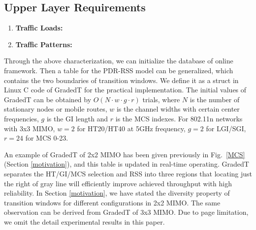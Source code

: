 \documentclass[draftclsnofoot,journal,onecolumn,11pt]{IEEEtran}
\begin{document}
\subsection{Upper Layer Requirements} \label{sect:upper}

\begin{enumerate}
  \item \textbf{Traffic Loads:}
  \item \textbf{Traffic Patterns:}
\end{enumerate}

Through the above characterization, we can initialize the database of online framework. Then a table for the PDR-RSS model can be generalized, which contains the two boundaries of transition windows. We define it as a struct in Linux C code of GradedT for the practical implementation. The initial values of GradedT can be obtained by $\textit{O}(N \cdot w \cdot g \cdot r)$ trials, where $N$ is the number of stationary nodes or mobile routes, $w$ is the channel widths with certain center frequencies, $g$ is the GI length and $r$ is the MCS indexes. For 802.11n networks with 3x3 MIMO, $w=2$ for HT20/HT40 at 5GHz frequency, $g=2$ for LGI/SGI, $r=24$ for MCS 0-23.

An example of GradedT of 2x2 MIMO has been given previously in Fig.~\ref{MCS} (Section \ref{motivation}), and this table is updated in real-time operating. GradedT separates the HT/GI/MCS selection and RSS into three regions that locating just the right of gray line will efficiently improve achieved throughput with high reliability. In Section \ref{motivation}, we have stated the diversity property of transition windows for different configurations in 2x2 MIMO. The same observation can be derived from GradedT of 3x3 MIMO. Due to page limitation, we omit the detail experimental results in this paper.
\end{document}
